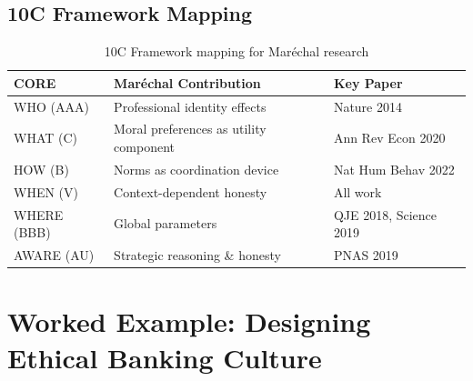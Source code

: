 \subsection{10C Framework Mapping}

\begin{table}[h]
\centering
\begin{tabular}{lll}
\hline
\textbf{CORE} & \textbf{Maréchal Contribution} & \textbf{Key Paper} \\
\hline
WHO (AAA) & Professional identity effects & Nature 2014 \\
WHAT (C) & Moral preferences as utility component & Ann Rev Econ 2020 \\
HOW (B) & Norms as coordination device & Nat Hum Behav 2022 \\
WHEN (V) & Context-dependent honesty & All work \\
WHERE (BBB) & Global parameters & QJE 2018, Science 2019 \\
AWARE (AU) & Strategic reasoning \& honesty & PNAS 2019 \\
\hline
\end{tabular}
\caption{10C Framework mapping for Maréchal research}
\end{table}

\section{Worked Example: Designing Ethical Banking Culture}

